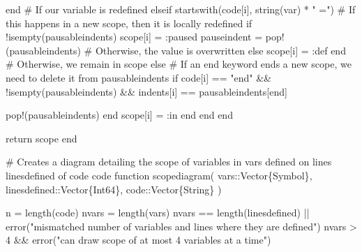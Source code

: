 \documentclass[
  letterpaper,
  DIV=11,
  numbers=noendperiod]{scrreprt}
\newenvironment{Shaded}{\begin{snugshade}}{\end{snugshade}}
\newcommand{\CommentTok}[1]{\textcolor[rgb]{0.37,0.37,0.37}{#1}}
\newcommand{\ControlFlowTok}[1]{\textcolor[rgb]{0.00,0.23,0.31}{#1}}
\newcommand{\DataTypeTok}[1]{\textcolor[rgb]{0.68,0.00,0.00}{#1}}
\newcommand{\FloatTok}[1]{\textcolor[rgb]{0.68,0.00,0.00}{#1}}
\newcommand{\FunctionTok}[1]{\textcolor[rgb]{0.28,0.35,0.67}{#1}}
\newcommand{\KeywordTok}[1]{\textcolor[rgb]{0.00,0.23,0.31}{#1}}
\newcommand{\NormalTok}[1]{\textcolor[rgb]{0.00,0.23,0.31}{#1}}
\newcommand{\OperatorTok}[1]{\textcolor[rgb]{0.37,0.37,0.37}{#1}}
\newcommand{\StringTok}[1]{\textcolor[rgb]{0.13,0.47,0.30}{#1}}
\begin{document}
\begin{Shaded}
\begin{Highlighting}[]
                \ControlFlowTok{end}
            \CommentTok{\# If our variable is redefined}
            \ControlFlowTok{elseif} \FunctionTok{startswith}\NormalTok{(code[i], }\FunctionTok{string}\NormalTok{(var) }\OperatorTok{*} \StringTok{" ="}\NormalTok{)}
                \CommentTok{\# If this happens in a new scope, then it is locally redefined}
                \ControlFlowTok{if}\NormalTok{ !}\FunctionTok{isempty}\NormalTok{(pausableindents)}
\NormalTok{                    scope[i] }\OperatorTok{=} \OperatorTok{:}\NormalTok{paused}
\NormalTok{                    pauseindent }\OperatorTok{=} \FunctionTok{pop!}\NormalTok{(pausableindents)}
                \CommentTok{\# Otherwise, the value is overwritten}
                \ControlFlowTok{else}
\NormalTok{                    scope[i] }\OperatorTok{=} \OperatorTok{:}\NormalTok{def}
                \ControlFlowTok{end}
            \CommentTok{\# Otherwise, we remain in scope}
            \ControlFlowTok{else}
                \CommentTok{\# If an \textasciigrave{}end\textasciigrave{} keyword ends a new scope, we need to delete it from \textasciigrave{}pausableindents\textasciigrave{}}
                \ControlFlowTok{if}\NormalTok{ code[i] }\OperatorTok{==} \StringTok{"end"} \OperatorTok{\&\&}
\NormalTok{                    !}\FunctionTok{isempty}\NormalTok{(pausableindents) }\OperatorTok{\&\&}
\NormalTok{                    indents[i] }\OperatorTok{==}\NormalTok{ pausableindents[}\KeywordTok{end}\NormalTok{]}
                    
                    \FunctionTok{pop!}\NormalTok{(pausableindents)}
                \ControlFlowTok{end}
\NormalTok{                scope[i] }\OperatorTok{=} \OperatorTok{:}\KeywordTok{in}
            \ControlFlowTok{end}
        \ControlFlowTok{end}
    \ControlFlowTok{end}
    
    \ControlFlowTok{return}\NormalTok{ scope}
\KeywordTok{end}

\CommentTok{\# Creates a diagram detailing the scope of variables in \textasciigrave{}vars\textasciigrave{} defined on lines \textasciigrave{}linesdefined\textasciigrave{} of code \textasciigrave{}code\textasciigrave{}}
\KeywordTok{function} \FunctionTok{scopediagram}\NormalTok{(}
\NormalTok{    vars}\OperatorTok{::}\DataTypeTok{Vector\{Symbol\}}\NormalTok{,}
\NormalTok{    linesdefined}\OperatorTok{::}\DataTypeTok{Vector\{Int64\}}\NormalTok{,}
\NormalTok{    code}\OperatorTok{::}\DataTypeTok{Vector\{String\}}
\NormalTok{)}

\NormalTok{    n }\OperatorTok{=} \FunctionTok{length}\NormalTok{(code)}
\NormalTok{    nvars }\OperatorTok{=} \FunctionTok{length}\NormalTok{(vars)}
\NormalTok{    nvars }\OperatorTok{==} \FunctionTok{length}\NormalTok{(linesdefined) }\OperatorTok{||} \FunctionTok{error}\NormalTok{(}\StringTok{"mismatched number of variables and lines where they are defined"}\NormalTok{)}
\NormalTok{    nvars }\OperatorTok{\textgreater{}} \FloatTok{4} \OperatorTok{\&\&} \FunctionTok{error}\NormalTok{(}\StringTok{"can draw scope of at most 4 variables at a time"}\NormalTok{)}


\end{Highlighting}
\end{Shaded}
\end{document}
